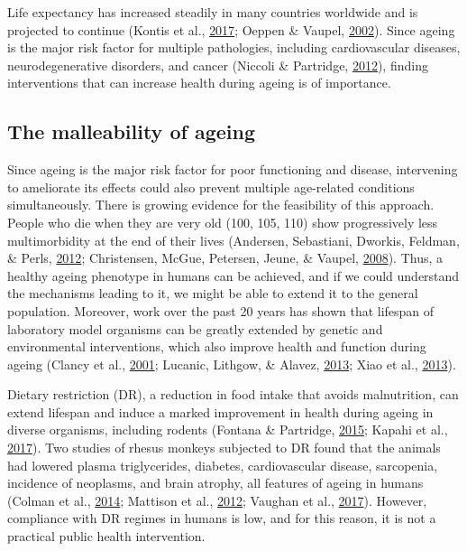 \documentclass[12pt,twoside]{unicam}
\begin{document}
Life expectancy has increased steadily in many countries worldwide and is projected to continue (Kontis et al., \protect\hyperlink{ref-Kontis2017}{2017}; Oeppen \& Vaupel, \protect\hyperlink{ref-Oeppen2002}{2002}). Since ageing is the major risk factor for multiple pathologies, including cardiovascular diseases, neurodegenerative disorders, and cancer (Niccoli \& Partridge, \protect\hyperlink{ref-Niccoli2012}{2012}), finding interventions that can increase health during ageing is of importance.

\hypertarget{the-malleability-of-ageing}{%
\subsection{The malleability of ageing}\label{the-malleability-of-ageing}}

Since ageing is the major risk factor for poor functioning and disease, intervening to ameliorate its effects could also prevent multiple age-related conditions simultaneously. There is growing evidence for the feasibility of this approach. People who die when they are very old (100, 105, 110) show progressively less multimorbidity at the end of their lives (Andersen, Sebastiani, Dworkis, Feldman, \& Perls, \protect\hyperlink{ref-Andersen2012}{2012}; Christensen, McGue, Petersen, Jeune, \& Vaupel, \protect\hyperlink{ref-Christensen2008}{2008}). Thus, a healthy ageing phenotype in humans can be achieved, and if we could understand the mechanisms leading to it, we might be able to extend it to the general population. Moreover, work over the past 20 years has shown that lifespan of laboratory model organisms can be greatly extended by genetic and environmental interventions, which also improve health and function during ageing (Clancy et al., \protect\hyperlink{ref-Clancy2001}{2001}; Lucanic, Lithgow, \& Alavez, \protect\hyperlink{ref-Lucanic2013}{2013}; Xiao et al., \protect\hyperlink{ref-Xiao2013}{2013}).

Dietary restriction (DR), a reduction in food intake that avoids malnutrition, can extend lifespan and induce a marked improvement in health during ageing in diverse organisms, including rodents (Fontana \& Partridge, \protect\hyperlink{ref-Fontana2015}{2015}; Kapahi et al., \protect\hyperlink{ref-Kapahi2017}{2017}). Two studies of rhesus monkeys subjected to DR found that the animals had lowered plasma triglycerides, diabetes, cardiovascular disease, sarcopenia, incidence of neoplasms, and brain atrophy, all features of ageing in humans (Colman et al., \protect\hyperlink{ref-Colman2014}{2014}; Mattison et al., \protect\hyperlink{ref-Mattison2012}{2012}; Vaughan et al., \protect\hyperlink{ref-Vaughan2017}{2017}). However, compliance with DR regimes in humans is low, and for this reason, it is not a practical public health intervention.
\end{document}
